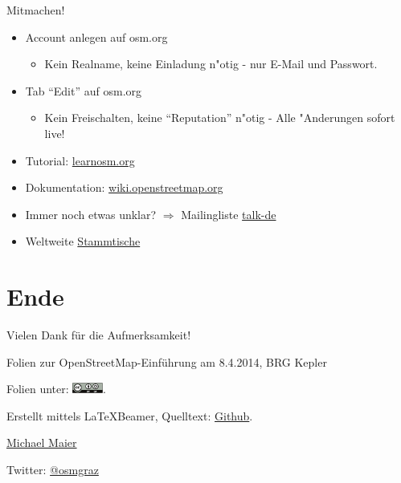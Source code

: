 \documentclass{beamer}
\begin{document}
\begin{frame}{Mitmachen!}
\begin{itemize}
  \item Account anlegen auf osm.org
	\begin{itemize}
		\item Kein Realname, keine Einladung n"otig - nur E-Mail und Passwort.
	\end{itemize}
  \item Tab "`Edit"' auf osm.org
	\begin{itemize}
		\item Kein Freischalten, keine "`Reputation"' n"otig - Alle "Anderungen sofort live!
	\end{itemize}
  \item Tutorial:  \href{http://learnosm.org/}{learnosm.org} 
  \item Dokumentation: \href{http://wiki.openstreetmap.org}{wiki.openstreetmap.org}
  \item Immer noch etwas unklar? $\Rightarrow$ Mailingliste \href{http://lists.openstreetmap.org/listinfo/talk-de}{talk-de}
  \item Weltweite \href{http://usergroups.openstreetmap.de/}{Stammtische}
\end{itemize}

\end{frame}


\section{Ende}

\begin{frame}{Vielen Dank für die Aufmerksamkeit!}

  Folien zur OpenStreetMap-Einführung am 8.4.2014, BRG Kepler
\vspace{1cm}

Folien unter: \includegraphics[width=1cm]{cc-by-sa.pdf}.
\vspace{1cm}

Erstellt mittels \LaTeX Beamer, Quelltext: \href{https://github.com/species/vortrag-osm-kepler}{Github}.
\vspace{1cm}

\href{mailto:michael.maier@student.tugraz.at}{Michael Maier}

Twitter: \href{https://twitter.com/osmgraz}{@osmgraz}
\end{frame}
\end{document}
